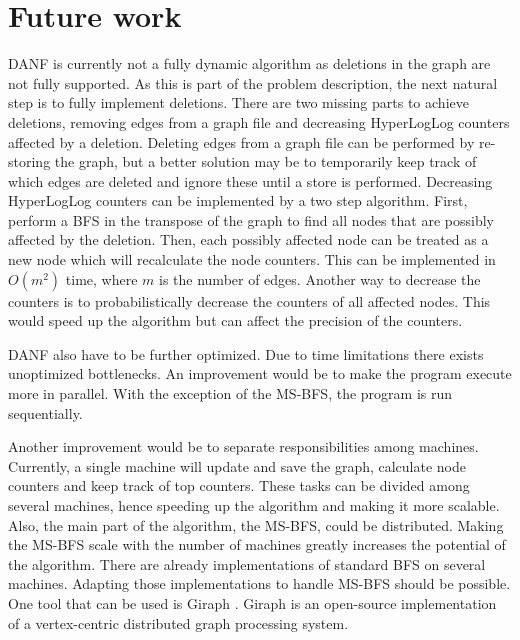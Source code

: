\section{Future work}
\label{sec:future_work}
DANF is currently not a fully dynamic algorithm as deletions in the graph are not fully supported. As this is part of the problem description, the next natural step is to fully implement deletions. There are two missing parts to achieve deletions, removing edges from a graph file and decreasing HyperLogLog counters affected by a deletion. Deleting edges from a graph file can be performed by re-storing the graph, but a better solution may be to temporarily keep track of which edges are deleted and ignore these until a store is performed. Decreasing HyperLogLog counters can be implemented by a two step algorithm. First, perform a BFS in the transpose of the graph to find all nodes that are possibly affected by the deletion. Then, each possibly affected node can be treated as a new node which will recalculate the node counters. This can be implemented in $O(m^2)$ time, where $m$ is the number of edges. Another way to decrease the counters is to probabilistically decrease the counters of all affected nodes. This would speed up the algorithm but can affect the precision of the counters.

DANF also have to be further optimized. Due to time limitations there exists unoptimized bottlenecks. An improvement would be to make the program execute more in parallel. With the exception of the MS-BFS, the program is run sequentially. 

Another improvement would be to separate responsibilities among machines. Currently, a single machine will update and save the graph, calculate node counters and keep track of top counters. These tasks can be divided among several machines, hence speeding up the algorithm and making it more scalable. Also, the main part of the algorithm, the MS-BFS, could be distributed. Making the MS-BFS scale with the number of machines greatly increases the potential of the algorithm. There are already implementations of standard BFS on several machines. Adapting those implementations to handle MS-BFS should be possible. One tool that can be used is Giraph \cite{giraph}. Giraph is an open-source implementation of a vertex-centric distributed graph processing system.
